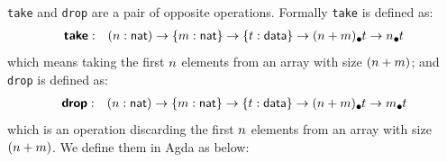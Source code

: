 \documentclass{l4proj}
\begin{document}
\texttt{take} and \texttt{drop} are a pair of opposite operations. Formally \texttt{take} is defined as:
\begin{align}
\label{lift:take}
    \prim{take}&:&(\n : \natkind) \to \{\m : \natkind\} \to \{\dt : \datatype\} \to \lArray{(\n + \m)}{\dt} \to \lArray{n}{\dt}
\end{align}
which means taking the first $n$ elements from an array with size $(n + m)$; and \texttt{drop} is defined as:
\begin{align}
\label{lift:drop}
    \prim{drop}&:&(\n : \natkind) \to \{\m : \natkind\} \to \{\dt : \datatype\} \to \lArray{(\n + \m)}{\dt} \to \lArray{m}{\dt}
\end{align}
which is an operation discarding the first $n$ elements from an array with size $(n + m)$. We define them in Agda as below:
\begin{code}%
\>[0]\<%
\\
\>[0]\AgdaSpace{}%
\AgdaSymbol{:}\AgdaSpace{}%
\AgdaSymbol{(}\AgdaSpace{}%
\AgdaSymbol{:}\AgdaSpace{}%
\AgdaSymbol{)}\AgdaSpace{}%
\AgdaSpace{}%
\AgdaSymbol{\{}\AgdaSpace{}%
\AgdaSymbol{:}\AgdaSpace{}%
\AgdaSymbol{\}}\AgdaSpace{}%
\AgdaSpace{}%
\AgdaSymbol{\{}\AgdaSpace{}%
\AgdaSymbol{:}\AgdaSpace{}%
\AgdaSymbol{\}}\AgdaSpace{}%
\AgdaSpace{}%
\AgdaSpace{}%
\AgdaSpace{}%
\AgdaSymbol{(}\AgdaSpace{}%
\AgdaOperator{\AgdaPrimitive{+}}\AgdaSpace{}%
\AgdaSymbol{)}\AgdaSpace{}%
\AgdaSpace{}%
\AgdaSpace{}%
\AgdaSpace{}%
\<%
\\
\>[0]\AgdaSpace{}%
\AgdaSpace{}%
\AgdaSpace{}%
\AgdaSymbol{=}\AgdaSpace{}%
\AgdaInductiveConstructor{[]}\<%
\\
\>[0]\AgdaSpace{}%
\AgdaSymbol{(}\AgdaSpace{}%
\AgdaSymbol{)}\AgdaSpace{}%
\AgdaSymbol{\{}\AgdaSymbol{\}}\AgdaSpace{}%
\AgdaSymbol{(}\AgdaSpace{}%
\AgdaSpace{}%
\AgdaSymbol{)}\AgdaSpace{}%
\AgdaSymbol{=}\AgdaSpace{}%
\AgdaSpace{}%
\AgdaSpace{}%
\AgdaSymbol{(}\AgdaSpace{}%
\AgdaSpace{}%
\AgdaSymbol{\{}\AgdaSymbol{\}}\AgdaSpace{}%
\AgdaSymbol{)}\<%
\end{code}
\end{document}
